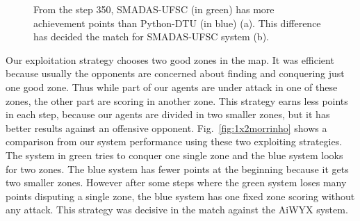 

\begin{figure}
	\centering
	\hspace{0cm} %
	\caption{From the step 350, SMADAS-UFSC (in green) has more achievement points than Python-DTU (in blue) (a). This difference has decided the match for SMADAS-UFSC system (b).}
	\label{fig:achievementpoints}
\end{figure} 

Our exploitation strategy chooses two good zones in the map. It was efficient because usually the opponents are concerned about finding and conquering just one good zone. Thus while part of our agents are under attack in one of these zones, the other part are scoring in another zone. This strategy earns less points in each step, because our agents are divided in two smaller zones, but it has better results against an offensive opponent.  Fig.~\ref{fig:1x2morrinho} shows a comparison from our system performance using these two exploiting strategies. The system in green tries to conquer one single zone and the blue system looks for two zones. The blue system has fewer points at the beginning because it gets two smaller zones. However after some steps where the green system loses many points disputing a single zone, the blue system has one fixed zone scoring without any attack. This strategy was decisive in the match against the AiWYX system. 

